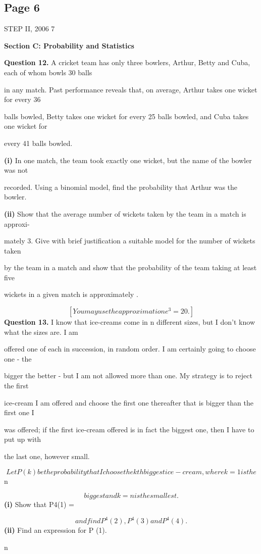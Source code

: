 \documentclass[12pt]{article}
\begin{document}
\subsection*{Page 6}
\begin{flushleft}
STEP II, 2006 7\par
\bigskip\textbf{Section C: Probability and Statistics}\par
\bigskip\textbf{Question 12.} A cricket team has only three bowlers, Arthur, Betty and Cuba, each of whom bowls 30 balls\par
in any match. Past performance reveals that, on average, Arthur takes one wicket for every 36\par
balls bowled, Betty takes one wicket for every 25 balls bowled, and Cuba takes one wicket for\par
every 41 balls bowled.\par
\textbf{(i)} In one match, the team took exactly one wicket, but the name of the bowler was not\par
recorded. Using a binomial model, find the probability that Arthur was the bowler.\par
\textbf{(ii)} Show that the average number of wickets taken by the team in a match is approxi-\par
mately 3. Give with brief justification a suitable model for the number of wickets taken\par
by the team in a match and show that the probability of the team taking at least five\par
wickets in a given match is approximately .\par
\[[You may use the approximation e^3 = 20.]\]
\bigskip\textbf{Question 13.} I know that ice-creams come in n different sizes, but I don't know what the sizes are. I am\par
offered one of each in succession, in random order. I am certainly going to choose one - the\par
bigger the better - but I am not allowed more than one. My strategy is to reject the first\par
ice-cream I am offered and choose the first one thereafter that is bigger than the first one I\par
was offered; if the first ice-cream offered is in fact the biggest one, then I have to put up with\par
the last one, however small.\par
\[Let P (k) be the probability that I choose the kth biggest ice-cream, where k = 1 is the\]
n\par
\[biggest and k = n is the smallest.\]
\textbf{(i)} Show that P4(1) =\par
\[and find P^4(2), P^4(3) and P^4(4).\]
\textbf{(ii)} Find an expression for P (1).\par
n\par
\end{flushleft}
\end{document}
